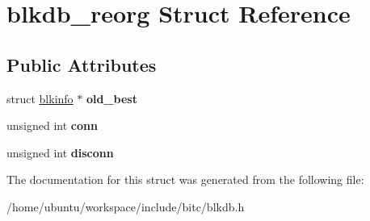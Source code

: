 \hypertarget{structblkdb__reorg}{\section{blkdb\-\_\-reorg Struct Reference}
\label{structblkdb__reorg}
}
\subsection*{Public Attributes}
\begin{DoxyCompactItemize}
\item 
\hypertarget{structblkdb__reorg_a8513696a46a127551c31f739976c829a}{struct \hyperlink{structblkinfo}{blkinfo} $\ast$ {\bfseries old\-\_\-best}}\label{structblkdb__reorg_a8513696a46a127551c31f739976c829a}

\item 
\hypertarget{structblkdb__reorg_a3ca585b673f04d381dd6d90fae4a616e}{unsigned int {\bfseries conn}}\label{structblkdb__reorg_a3ca585b673f04d381dd6d90fae4a616e}

\item 
\hypertarget{structblkdb__reorg_a4f1c3ef0ba1e6ebbd20f786fb4b05915}{unsigned int {\bfseries disconn}}\label{structblkdb__reorg_a4f1c3ef0ba1e6ebbd20f786fb4b05915}

\end{DoxyCompactItemize}


The documentation for this struct was generated from the following file\-:\begin{DoxyCompactItemize}
\item 
/home/ubuntu/workspace/include/bitc/blkdb.\-h\end{DoxyCompactItemize}

